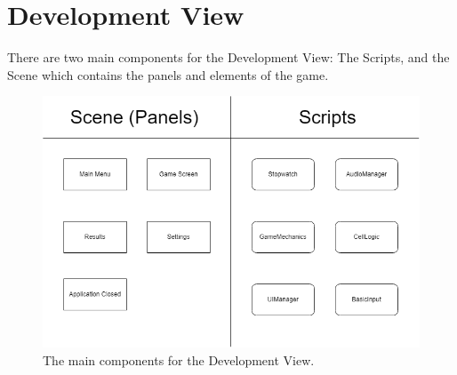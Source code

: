 \section{Development View}
\label{sec:DevView}

There are two main components for the Development View: The Scripts, and the Scene which contains the panels and elements of the game.

\begin{figure}[!htb]
    \centering
    \includegraphics[width=12cm]{Images/DevView.png}
       \caption{The main components for the Development View.}
           \label{Fig:DevView}
\end{figure}

